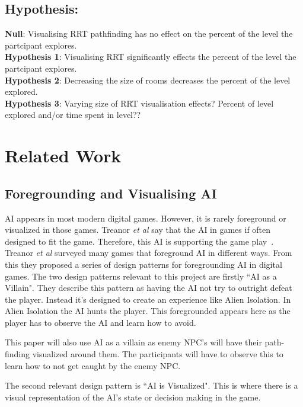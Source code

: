 \documentclass[journal]{IEEEtran}
\begin{document}
\subsection{Hypothesis:}
\textbf{Null}: Visualising RRT pathfinding has no effect on the percent of the level the partcipant explores. \\
\textbf{Hypothesis 1}: Visualising RRT significantly effects the percent of the level the partcipant explores. \\
\textbf{Hypothesis 2}: Decreasing the size of rooms decreases the percent of the level explored. \\ 
\textbf{Hypothesis 3}: Varying size of RRT visualisation effects? 
Percent of level explored and/or time spent in level??


\section{Related Work}
\subsection{Foregrounding and Visualising AI}
AI appears in most modern digital games. However, it is rarely foreground or visualized in those games.  Treanor  \textit{et al} say that the AI in games if often designed to fit the game. Therefore, this AI is supporting the game play~\cite{treanor2015, eladhari2011}.  \\


Treanor  \textit{et al}  surveyed many games that foreground AI in different ways.  From this they proposed a series of design patterns for foregrounding AI in digital games. 
The two design patterns relevant to this project are firstly ``AI as a Villain".  They describe this pattern as having the AI not try to outright defeat the player. Instead it's designed to create an experience like Alien Isolation.  In Alien Isolation the AI hunts the player. This foregrounded appears here as the player has to observe the AI and learn how to avoid. 

This paper will also use AI as a villain as enemy NPC's  will have their path-finding visualized around them. The participants will have to observe this to learn how to not get caught by the enemy NPC.  


The second relevant design pattern is ``AI is Visualized". This is where there is a visual representation of the AI's state or decision making in the game. 
\end{document}
